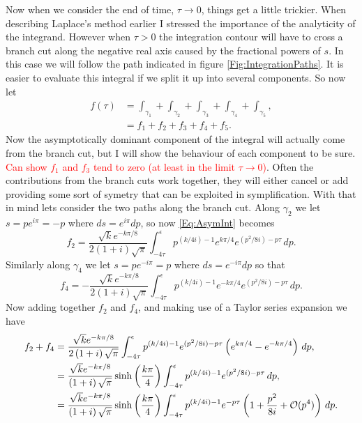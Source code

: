 Now when we consider the end of time, $\tau \to 0$, things get a little trickier.
When describing Laplace's method earlier I stressed the importance of the analyticity of the integrand.
However when $\tau > 0$ the integration contour will have to cross a branch cut along the negative real axis caused by the fractional powers of $s$. 
In this case we will follow the path indicated in figure \ref{Fig:IntegrationPaths}. 
It is easier to evaluate this integral if we split it up into several components.
So now let
\begin{align}
	f(\tau) &= \int_{\gamma_{1}} + \int_{\gamma_{2}} + \int_{\gamma_{3}} + \int_{\gamma_{4}} + \int_{\gamma_{5}},\\
	&= f_{1} + f_{2} + f_{3} + f_{4} + f_{5} .
\end{align}
Now the asymptotically dominant component of the integral will actually come from the branch cut, but I will show the behaviour of each component to be sure.
\textcolor{red}{Can show $f_{1}$ and $f_{3}$ tend to zero (at least in the limit $\tau \to 0$)}. 
Often the contributions from the branch cuts work together, they will either cancel or add providing some sort of symetry that can be exploited in symplification.
With that in mind lets consider the two paths along the branch cut.
Along $\gamma_{2}$ we let $s = pe^{i \pi} = -p$ where $ds = e^{i \pi}dp$, so now \autoref{Eq:AsymInt} becomes
\begin{equation}
	f_{2} = \frac{\sqrt{k} e^{-k\pi/8}}{2\left(1+i\right)\sqrt{\pi}}\int_{-4\tau}^{\epsilon} p^{(k/4i)-1}e^{k\pi/4}e^{(p^{2}/8i) -p\tau}\, dp.
\end{equation}
Similarly along $\gamma_{4}$ we let $s = pe^{-i\pi} = p$ where $ds = e^{-i\pi}dp$ so that
\begin{equation}
	f_{4} = -\frac{\sqrt{k} e^{-k\pi/8}}{2\left(1+i\right)\sqrt{\pi}}\int_{-4\tau}^{\epsilon} p^{(k/4i)-1}e^{-k\pi/4}e^{(p^{2}/8i) -p\tau}\, dp.
\end{equation}
Now adding together $f_{2}$ and $f_{4}$, and making use of a Taylor series expansion we have
\begin{align}
	f_{2} + f_{4} &= \frac{\sqrt{k} e^{-k\pi/8}}{2\left(1+i\right)\sqrt{\pi}}\int_{-4\tau}^{\epsilon} p^{(k/4i)-1}e^{(p^{2}/8i) -p\tau}\left(e^{k\pi/4}-e^{-k\pi/4}\right)\, dp,\\
	&= \frac{\sqrt{k} e^{-k\pi/8}}{\left(1+i\right)\sqrt{\pi}}\sinh\left(\frac{k\pi}{4}\right)\int_{-4\tau}^{\epsilon} p^{(k/4i)-1}e^{(p^{2}/8i) -p\tau}\, dp,\\
	&= \frac{\sqrt{k} e^{-k\pi/8}}{\left(1+i\right)\sqrt{\pi}}\sinh\left(\frac{k\pi}{4}\right)\int_{-4\tau}^{\epsilon} p^{(k/4i)-1}e^{-p\tau}\left(1 + \frac{p^{2}}{8i} + {\cal O}(p^{4})\right)\, dp.
\end{align}
